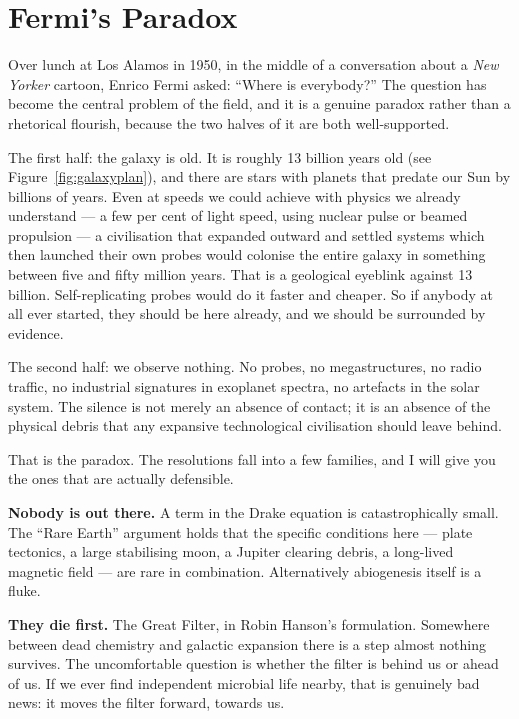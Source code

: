 \section{Fermi's Paradox}\label{sec:fermi}

Over lunch at Los Alamos in 1950, in the middle of a conversation about a
\emph{New Yorker} cartoon, Enrico Fermi asked: ``Where is everybody?'' The question has
become the central problem of the field, and it is a genuine paradox rather than a rhetorical
flourish, because the two halves of it are both well-supported.

The first half: the galaxy is old. It is roughly 13 billion years old (see Figure~\ref{fig:galaxyplan}), and there are stars
with planets that predate our Sun by billions of years. Even at speeds we could achieve with
physics we already understand --- a few per cent of light speed, using nuclear pulse or beamed
propulsion --- a civilisation that expanded outward and settled systems which then launched
their own probes would colonise the entire galaxy in something between five and fifty million
years. That is a geological eyeblink against 13 billion. Self-replicating probes would do it
faster and cheaper. So if anybody at all ever started, they should be here already, and we
should be surrounded by evidence.

The second half: we observe nothing. No probes, no megastructures, no radio traffic, no
industrial signatures in exoplanet spectra, no artefacts in the solar system. The silence is
not merely an absence of contact; it is an absence of the physical debris that any expansive
technological civilisation should leave behind.

That is the paradox. The resolutions fall into a few families, and I will give you the ones
that are actually defensible.

\textbf{Nobody is out there.} A term in the Drake equation is catastrophically small. The
``Rare Earth'' argument holds that the specific conditions here --- plate tectonics, a large
stabilising moon, a Jupiter clearing debris, a long-lived magnetic field --- are rare in
combination. Alternatively abiogenesis itself is a fluke.

\textbf{They die first.} The Great Filter, in Robin Hanson's formulation. Somewhere between
dead chemistry and galactic expansion there is a step almost nothing survives. The
uncomfortable question is whether the filter is behind us or ahead of us. If we ever find
independent microbial life nearby, that is genuinely bad news: it moves the filter forward,
towards us.

